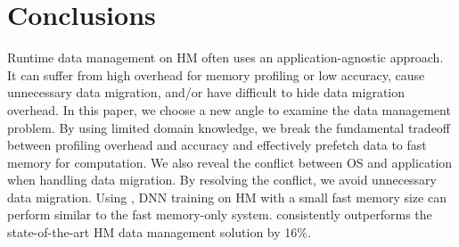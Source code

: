\vspace{-5pt}
\section{Conclusions}
\vspace{-1pt}
Runtime data management on HM often uses an application-agnostic approach. It can suffer from high overhead for memory profiling or low accuracy, cause unnecessary data migration, and/or have difficult to hide data migration overhead. In this paper, we choose 
a new angle to examine the data management problem. By using limited domain knowledge, %
we break the fundamental tradeoff between profiling overhead and accuracy and effectively prefetch data to fast memory for computation. We also reveal the conflict between OS and application when handling data migration. By resolving the conflict, we avoid unnecessary data migration. 
Using \name, DNN training on HM with a small fast memory size can perform similar to the fast memory-only system. \name consistently outperforms the state-of-the-art HM data management solution by 16\%.


